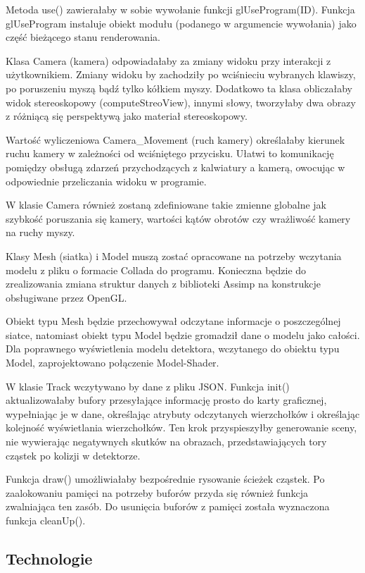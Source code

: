 Metoda use() zawierałaby w sobie wywołanie funkcji glUseProgram(ID). Funkcja glUseProgram instaluje obiekt modułu (podanego w argumencie wywołania) jako część bieżącego stanu renderowania.

Klasa Camera (kamera) odpowiadałaby za zmiany widoku przy interakcji z użytkownikiem. Zmiany widoku by zachodziły po wciśnieciu wybranych klawiszy, po poruszeniu myszą bądź tylko kółkiem myszy. Dodatkowo ta klasa obliczałaby widok stereoskopowy (computeStreoView), innymi słowy, tworzyłaby dwa obrazy z różniącą się perspektywą jako materiał stereoskopowy. 

Wartość wyliczeniowa Camera\_Movement (ruch kamery) określałaby kierunek ruchu kamery w zależności od wciśniętego przycisku. Ułatwi to komunikację pomiędzy obsługą zdarzeń przychodzących z kalwiatury a kamerą, owocując w odpowiednie przeliczania widoku w programie. 

W klasie Camera również zostaną zdefiniowane takie zmienne globalne jak szybkość poruszania się kamery, wartości kątów obrotów czy wrażliwość kamery na ruchy myszy.

Klasy Mesh (siatka) i Model muszą zostać opracowane na potrzeby wczytania modelu z pliku o formacie Collada do programu. Konieczna będzie do zrealizowania zmiana struktur danych z biblioteki Assimp na konstrukcje obsługiwane przez OpenGL. 

Obiekt typu Mesh będzie przechowywał odczytane informacje o poszczególnej siatce, natomiast obiekt typu Model będzie gromadził dane o modelu jako całości. Dla poprawnego wyświetlenia modelu detektora, wczytanego do obiektu typu Model, zaprojektowano połączenie Model-Shader.

W klasie Track wczytywano by dane z pliku JSON. Funkcja init() aktualizowałaby bufory przesyłające informację prosto do karty graficznej, wypełniając je w dane, określając atrybuty odczytanych wierzchołków i określając kolejność wyświetlania wierzchołków. Ten krok przyspieszyłby generowanie sceny, nie wywierając negatywnych skutków na obrazach, przedstawiających tory cząstek po kolizji w detektorze.

Funkcja draw() umożliwiałaby bezpośrednie rysowanie ścieżek cząstek. Po zaalokowaniu pamięci na potrzeby buforów przyda się również funkcja zwalniająca ten zasób. Do usunięcia buforów z pamięci została wyznaczona funkcja cleanUp().

\subsection{Technologie}
